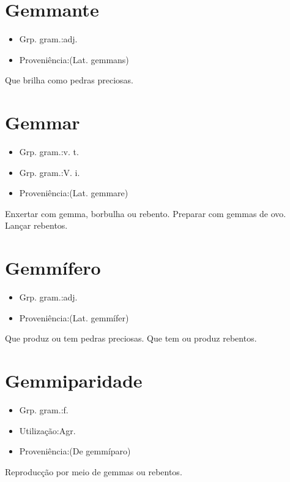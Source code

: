 \section{Gemmante}
\begin{itemize}
\item {Grp. gram.:adj.}
\end{itemize}
\begin{itemize}
\item {Proveniência:(Lat. \textunderscore gemmans\textunderscore )}
\end{itemize}
Que brilha como pedras preciosas.
\section{Gemmar}
\begin{itemize}
\item {Grp. gram.:v. t.}
\end{itemize}
\begin{itemize}
\item {Grp. gram.:V. i.}
\end{itemize}
\begin{itemize}
\item {Proveniência:(Lat. \textunderscore gemmare\textunderscore )}
\end{itemize}
Enxertar com gemma, borbulha ou rebento.
Preparar com gemmas de ovo.
Lançar rebentos.
\section{Gemmífero}
\begin{itemize}
\item {Grp. gram.:adj.}
\end{itemize}
\begin{itemize}
\item {Proveniência:(Lat. \textunderscore gemmífer\textunderscore )}
\end{itemize}
Que produz ou tem pedras preciosas.
Que tem ou produz rebentos.
\section{Gemmiparidade}
\begin{itemize}
\item {Grp. gram.:f.}
\end{itemize}
\begin{itemize}
\item {Utilização:Agr.}
\end{itemize}
\begin{itemize}
\item {Proveniência:(De \textunderscore gemmíparo\textunderscore )}
\end{itemize}
Reproducção por meio de gemmas ou rebentos.
